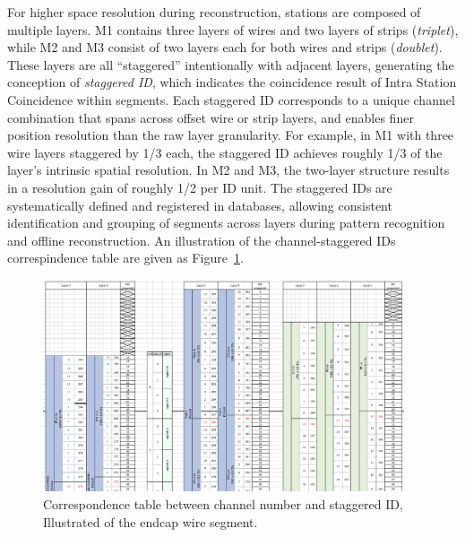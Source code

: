 For higher space resolution during reconstruction, stations are composed of multiple layers. M1 contains three layers of wires and two layers of strips (\textit{triplet}), while M2 and M3 consist of two layers each for both wires and strips (\textit{doublet}). These layers are all ``staggered'' intentionally with adjacent layers, generating the conception of \textit{staggered ID}, which indicates the coincidence result of Intra Station Coincidence within segments. Each staggered ID corresponds to a unique channel combination that spans across offset wire or strip layers, and enables finer position resolution than the raw layer granularity. For example, in M1 with three wire layers staggered by 1/3 each, the staggered ID achieves roughly 1/3 of the layer's intrinsic spatial resolution. In M2 and M3, the two-layer structure results in a resolution gain of roughly 1/2 per ID unit. The staggered IDs are systematically defined and registered in databases, allowing consistent identification and grouping of segments across layers during pattern recognition and offline reconstruction. An illustration of the channel-staggered IDs correspindence table are given as Figure~\ref{fig:staggeredID}.

\begin{figure}[htbp]
  \centering
  \includegraphics[width=0.95\textwidth]{figs/chapter2/staggeredID.png}
  \caption{Correspondence table between channel number and staggered ID, Illustrated of the endcap wire segment.}
  \label{fig:staggeredID}
\end{figure}


